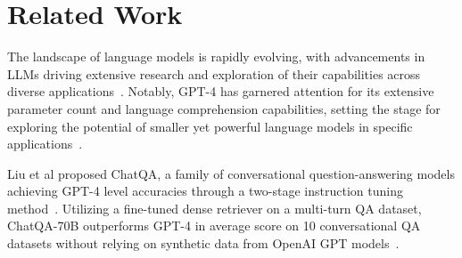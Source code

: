 \documentclass[runningheads]{llncs}
\begin{document}





\section{Related Work}
The landscape of language models is rapidly evolving, with advancements in LLMs driving extensive research and exploration of their capabilities across diverse applications~\cite{di2023retrieval}. Notably, GPT-4 has garnered attention for its extensive parameter count and language comprehension capabilities, setting the stage for exploring the potential of smaller yet powerful language models in specific applications~\cite{takagi2023performance}.

Liu et al proposed ChatQA, a family of conversational question-answering models achieving GPT-4 level accuracies through a two-stage instruction tuning method~\cite{liu2024chatqa}. Utilizing a fine-tuned dense retriever on a multi-turn QA dataset, ChatQA-70B outperforms GPT-4 in average score on 10 conversational QA datasets without relying on synthetic data from OpenAI GPT models~\cite{liu2024chatqa}.
\end{document}
